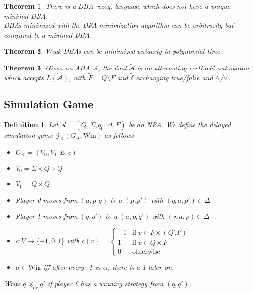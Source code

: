 \documentclass{article}
\newtheorem{theorem}{Theorem}[section]
\newtheorem{definition}{Definition}
\begin{document}
\begin{theorem}
	There is a DBA-recog. language which does not have a unique minimal DBA. \\
	DBAs minimized with the DFA minimization algorithm can be arbitrarily bad compared to a minimal DBA.
\end{theorem}

\begin{theorem}
	Weak DBAs can be minimized uniquely in polynomial time.
\end{theorem}

\begin{theorem}
	Given an ABA $\mathcal{A}$, the dual $\tilde{\mathcal{A}}$ is an alternating co-Büchi automaton which accepts $\overline{L(\mathcal{A})}$, with $\tilde{F} = Q \setminus F$ and $\tilde{\delta}$ exchanging true/false and $\land$/$\lor$.
\end{theorem}

\subsection{Simulation Game}
\begin{definition}
	Let $\mathcal{A} = (Q, \Sigma, q_0, \Delta, F)$ be an NBA. We define the delayed simulation game $\mathcal{G}_\mathcal{A}(G_\mathcal{A}, \text{Win})$ as follows
	\begin{itemize}
		\item $G_\mathcal{A} = (V_0, V_1, E, c)$ 
		\item $V_0 = \Sigma \times Q \times Q$
		\item $V_1 = Q \times Q$
		\item Player 0 moves from $(a, p, q)$ to a $(p, p')$ with $(q, a, p') \in \Delta$
		\item Player 1 moves from $(q, q')$ to a $(a, p, q')$ with $(q, a, p) \in \Delta$
		\item $c : V \rightarrow \{-1, 0, 1\}$ with $c(v) = \begin{cases} -1 & \text{if } v \in F \times (Q \setminus F) \\ 1 & \text{if } v \in Q \times F \\ 0 & \text{otherwise} \end{cases}$
		\item $\alpha \in \text{Win}$ iff after every -1 in $\alpha$, there is a 1 later on.
	\end{itemize}
	
	Write $q \preceq_\text{de} q'$ if player 0 has a winning strategy from $(q, q')$.
\end{definition}
\end{document}
